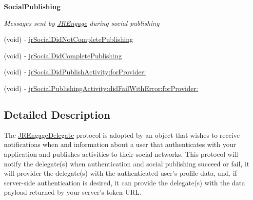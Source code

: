\begin{Indent}{\bf SocialPublishing}\par
{\em \label{_amgrpeb046f03f7c48654b2974e7c81bd7f9b}
 Messages sent by \hyperlink{class_j_r_engage}{JREngage} during social publishing }\begin{DoxyCompactItemize}
\item 
(void) -\/ \hyperlink{protocol_j_r_engage_delegate-p_a733007b584bd916932ccafe44c3c678d}{jrSocialDidNotCompletePublishing}
\item 
(void) -\/ \hyperlink{protocol_j_r_engage_delegate-p_ae90fea5db002559f6cf4e481080e0bfb}{jrSocialDidCompletePublishing}
\item 
(void) -\/ \hyperlink{protocol_j_r_engage_delegate-p_a4c3fd988961c22202786b400ddd889cc}{jrSocialDidPublishActivity:forProvider:}
\item 
(void) -\/ \hyperlink{protocol_j_r_engage_delegate-p_af6564add3b2fdbed2efbb118ddcf26ed}{jrSocialPublishingActivity:didFailWithError:forProvider:}
\end{DoxyCompactItemize}
\end{Indent}


\subsection{Detailed Description}
The \hyperlink{protocol_j_r_engage_delegate-p}{JREngageDelegate} protocol is adopted by an object that wishes to receive notifications when and information about a user that authenticates with your application and publishes activities to their social networks. This protocol will notify the delegate(s) when authentication and social publishing succeed or fail, it will provider the delegate(s) with the authenticated user's profile data, and, if server-\/side authentication is desired, it can provide the delegate(s) with the data payload returned by your server's token URL. 


